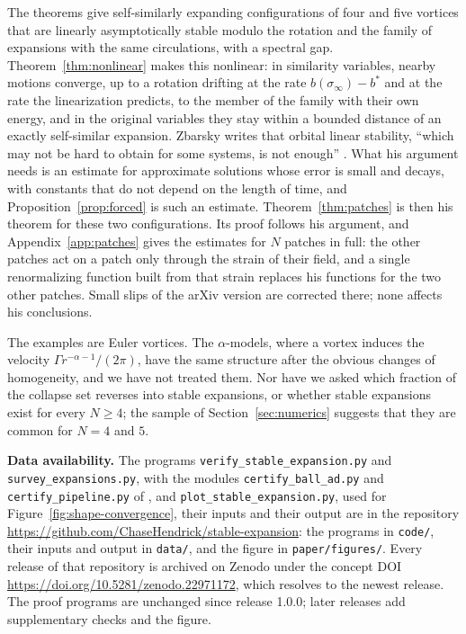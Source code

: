 \documentclass[11pt]{article}
\theoremstyle{definition}
\begin{document}
The theorems give self-similarly expanding configurations of four and five vortices that are linearly asymptotically stable modulo the rotation and the family of expansions with the same circulations, with a spectral gap. Theorem~\ref{thm:nonlinear} makes this nonlinear: in similarity variables, nearby motions converge, up to a rotation drifting at the rate $b(\sigma_\infty) - b^*$ and at the rate the linearization predicts, to the member of the family with their own energy, and in the original variables they stay within a bounded distance of an exactly self-similar expansion. Zbarsky writes that orbital linear stability, ``which may not be hard to obtain for some systems, is not enough'' \cite{zbarsky2021}. What his argument needs is an estimate for approximate solutions whose error is small and decays, with constants that do not depend on the length of time, and Proposition~\ref{prop:forced} is such an estimate. Theorem~\ref{thm:patches} is then his theorem for these two configurations. Its proof follows his argument, and Appendix~\ref{app:patches} gives the estimates for $N$ patches in full: the other patches act on a patch only through the strain of their field, and a single renormalizing function built from that strain replaces his functions for the two other patches. Small slips of the arXiv version are corrected there; none affects his conclusions.

The examples are Euler vortices. The $\alpha$-models, where a vortex induces the velocity $\Gamma r^{-\alpha-1}/(2\pi)$, have the same structure after the obvious changes of homogeneity, and we have not treated them. Nor have we asked which fraction of the collapse set reverses into stable expansions, or whether stable expansions exist for every $N \ge 4$; the sample of Section~\ref{sec:numerics} suggests that they are common for $N = 4$ and $5$.

\medskip
{\raggedright\noindent\textbf{Data availability.} The programs \texttt{verify\_\allowbreak stable\_\allowbreak expansion.py} and \texttt{survey\_\allowbreak expansions.py}, with the modules \texttt{certify\_\allowbreak ball\_\allowbreak ad.py} and \texttt{certify\_\allowbreak pipeline.py} of \cite{mw2026}, and \texttt{plot\_\allowbreak stable\_\allowbreak expansion.py}, used for Figure~\ref{fig:shape-convergence}, their inputs and their output are in the repository \url{https://github.com/ChaseHendrick/stable-expansion}: the programs in \texttt{code/}, their inputs and output in \texttt{data/}, and the figure in \texttt{paper/\allowbreak figures/}. Every release of that repository is archived on Zenodo under the concept DOI \url{https://doi.org/10.5281/zenodo.22971172}, which resolves to the newest release. The proof programs are unchanged since release 1.0.0; later releases add supplementary checks and the figure.\par}
\end{document}
